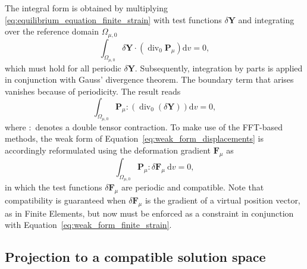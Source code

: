 The integral form is obtained by multiplying \eqref{eq:equilibrium_equation_finite_strain} with test functions \(\delta \bm Y\) and integrating over the reference domain \(\Omega_{\mu,0}\)
\begin{equation}
\int_{\Omega_{\mu,0}} \delta \bm Y \cdot\left(\operatorname{div}_0 \bm{P}_\mu\right) \mathrm{d} v=0,
\end{equation}
which must hold for all periodic \(\delta \bm Y\).
Subsequently, integration by parts is applied in conjunction with Gauss' divergence theorem.
The boundary term that arises vanishes because of periodicity.
The result reads
\begin{equation} \label{eq:weak_form_displacements}
\int_{\Omega_{\mu,0}}\bm{P}_\mu:\left(\operatorname{div}_0 \left(\delta \bm Y\right)\right) \mathrm{d} v=0,
\end{equation}
where \(:\) denotes a double tensor contraction.
To make use of the FFT-based methods, the weak form of Equation~\eqref{eq:weak_form_displacements} is accordingly reformulated using the deformation gradient \(\bm F_\mu\) as
\begin{equation} \label{eq:weak_form_finite_strain}
\int_{\Omega_{\mu,0}}  \bm{P}_\mu:\delta\bm{F}_\mu \mathrm{~d} v=0,
\end{equation}
in which the test functions \(\delta \bm{F}_\mu\) are periodic and compatible.
Note that compatibility is guaranteed when \(\delta \bm{F}_\mu\) is the gradient of a virtual position vector, as in Finite Elements, but now must be enforced as a constraint in conjunction with Equation~\eqref{eq:weak_form_finite_strain}.

\subsection{Projection to a compatible solution space}

